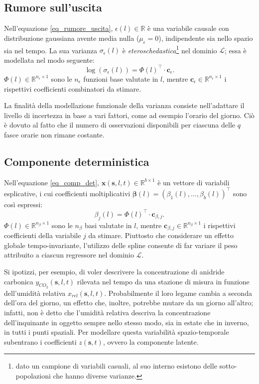 \subsection[Rumore sull'uscita]{Rumore sull'uscita}
Nell'equazione \ref{eq_rumore_uscita}, $\epsilon (l)\in\mathbb{R}$ è una variabile causale con distribuzione gaussiana avente media nulla ($\mu_\epsilon = 0$), indipendente sia nello spazio sia nel tempo. La sua varianza $\sigma_\epsilon(l)$ è \textit{eteroschedastica}\footnote{dato un campione di variabili casuali, al suo interno esistono delle sotto-popolazioni che hanno diverse varianze.} nel dominio $\mathcal{L}$; essa è modellata nel modo seguente:
\[
	\log(\sigma_\epsilon(l)) = \Phi(l)^\top\cdot\mathbf{c}_\epsilon.
\]
$\Phi(l)\in\mathbb{R}^{n_\epsilon\times 1}$ sono le $n_\epsilon$ funzioni base valutate in $l$, mentre $\mathbf{c}_\epsilon\in\mathbb{R}^{n_\epsilon\times 1}$ i rispettivi coefficienti combinatori da stimare. \par La finalità della modellazione funzionale della varianza consiste nell'adattare il livello di incertezza in base a vari fattori, come ad esempio l'orario del giorno. Ciò è dovuto al fatto che il numero di osservazioni disponibili per ciascuna delle $q$ fasce orarie non rimane costante.

\subsection[Componente deterministica]{Componente deterministica}
Nell'equazione \ref{eq_comp_det}, $\mathbf{x}(\mathbf{s}, l, t)\in\mathbb{R}^{b\times 1}$ è un vettore di variabili esplicative, i cui coefficienti moltiplicativi $\boldsymbol{\beta}(l) = (\beta_1(l),\dots,\beta_b(l))^\top$ sono così espressi:
\[
	\beta_j(l) = \Phi(l)^\top\cdot\mathbf{c}_{\beta, j}.
\]
$\Phi(l)\in\mathbb{R}^{n_\beta\times 1}$ sono le $n_\beta$ basi valutate in $l$, mentre $\mathbf{c}_{\beta, j}\in\mathbb{R}^{n_\beta\times 1}$ i rispettivi coefficienti della variabile $j$ da stimare. Piuttosto che considerare un effetto globale tempo-invariante, l'utilizzo delle spline consente di far variare il peso attribuito a ciascun regressore nel dominio $\mathcal{L}$. \par Si ipotizzi, per esempio, di voler descrivere la concentrazione di anidride carbonica $y_{CO_2}(\mathbf{s}, l, t)$ rilevata nel tempo da una stazione di misura in funzione dell'umidità relativa $x_{rel}(\mathbf{s}, l, t)$. Probabilmente il loro legame cambia a seconda dell'ora del giorno, un effetto che, inoltre, potrebbe mutare da un giorno all'altro; infatti, non è detto che l'umidità relativa descriva la concentrazione dell'inquinante in oggetto sempre nello stesso modo, sia in estate che in inverno, in tutti i punti spaziali. Per modellare questa variabilità spazio-temporale subentrano i coefficienti $z(\mathbf{s}, t)$, ovvero la componente latente.

